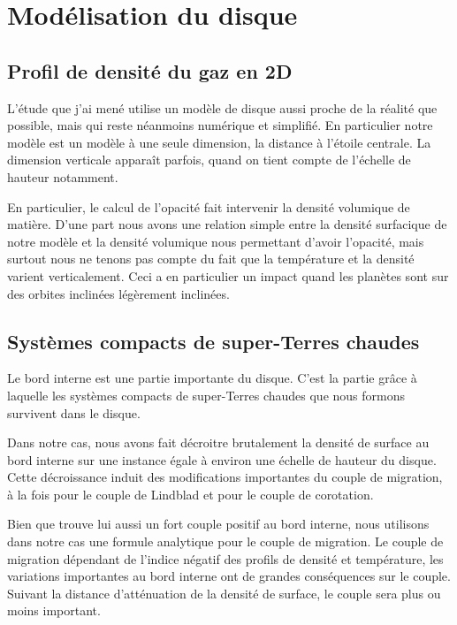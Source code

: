 \section{Modélisation du disque}
\subsection{Profil de densité du gaz en 2D}
L'étude que j'ai mené utilise un modèle de disque aussi proche de la réalité que possible, mais qui reste néanmoins numérique et simplifié. En particulier notre modèle est un modèle à une seule dimension, la distance à l'étoile centrale. La dimension verticale apparaît parfois, quand on tient compte de l'échelle de hauteur notamment. 

En particulier, le calcul de l'opacité fait intervenir la densité volumique de matière. D'une part nous avons une relation simple entre la densité surfacique de notre modèle et la densité volumique nous permettant d'avoir l'opacité, mais surtout nous ne tenons pas compte du fait que la température et la densité varient verticalement. Ceci a en particulier un impact quand les planètes sont sur des orbites inclinées légèrement inclinées. 


\subsection{Systèmes compacts de super-Terres chaudes}
Le bord interne est une partie importante du disque. C'est la partie grâce à laquelle les systèmes compacts de super-Terres chaudes que nous formons survivent dans le disque. 

Dans notre cas, nous avons fait décroitre brutalement la densité de surface au bord interne sur une instance égale à environ une échelle de hauteur du disque. Cette décroissance induit des modifications importantes du couple de migration, à la fois pour le couple de Lindblad et pour le couple de corotation. 

Bien que \cite{masset2006disk} trouve lui aussi un fort couple positif au bord interne, nous utilisons dans notre cas une formule analytique pour le couple de migration. Le couple de migration dépendant de l'indice négatif des profils de densité et température, les variations importantes au bord interne ont de grandes conséquences sur le couple. Suivant la distance d'atténuation de la densité de surface, le couple sera plus ou moins important. 

